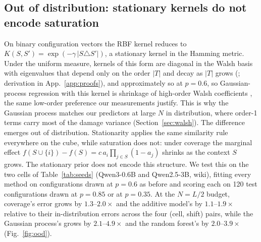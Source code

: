 
\subsection{Out of distribution: stationary kernels do not encode saturation}\label{sec:ood}

On binary configuration vectors the RBF kernel \citep{williams2006gpml} reduces to
$K(S,S') = \exp(-\gamma\,|S\triangle S'|)$, a stationary kernel in the Hamming metric. Under the
uniform measure, kernels of this
form are diagonal in the Walsh basis with eigenvalues that depend only on the order $|T|$ and decay as
$|T|$ grows (\citealp{odonnell2014boolean}; derivation in App.~\ref{app:proofs}), and approximately so
at $p=0.6$, so Gaussian-process regression with this kernel is
shrinkage of high-order Walsh coefficients \citep[Section~2.6]{williams2006gpml}, the same low-order
preference our measurements justify.
This is why the Gaussian process matches our predictors at large $N$ in distribution, where order-1
terms carry most of the damage variance (Section~\ref{sec:walsh}).
The difference emerges out of distribution. 
Stationarity applies the same similarity rule everywhere on
the cube, while saturation does not: under coverage the marginal effect
$f(S\cup\{i\})-f(S)=c\,a_i\prod_{j\in S}(1-a_j)$ shrinks as the context $S$ grows. The stationary prior
does not encode this structure.
We test this on the two cells of Table~\ref{tab:seeds} (Qwen3-0.6B and
Qwen2.5-3B, wiki), fitting every method on configurations drawn at $p=0.6$ as before and scoring each
on 120 test configurations drawn at $p=0.85$ 
or at $p=0.35$. At the $N=L/2$ budget, coverage's error grows by
$1.3$--$2.0\times$ and the additive model's by $1.1$--$1.9\times$ relative to their in-distribution
errors across the four (cell, shift) pairs, while the
Gaussian process's grows by $2.1$--$4.9\times$ and the random forest's by $2.0$--$3.9\times$
(Fig.~\ref{fig:ood}). 

